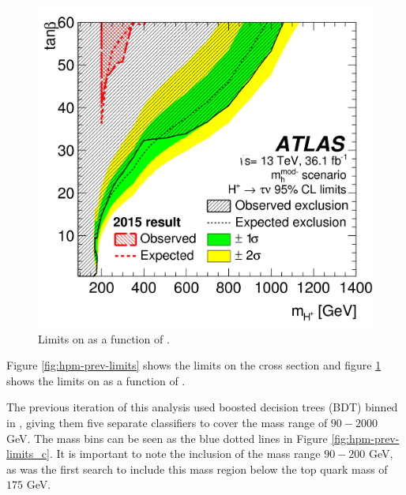 		\begin{figure}[!ht]
			\centering
			\includegraphics[width=0.75\linewidth]{chapters/chapter1_theory/images/Previous_Limits_Combined_tanb.png}
			\caption{\label{fig:hpm-prev-limits-tanb} Limits on \tanb as a function of \mHpm. \cite{hpm-previous} }
		\end{figure}
		Figure \ref{fig:hpm-prev-limits} shows the limits on the cross section and figure \ref{fig:hpm-prev-limits-tanb} shows the limits on \tanb as a function of \mHpm. 

		The previous iteration of this analysis used boosted decision trees (BDT) binned in \mHpm, giving them five separate classifiers to cover the mass range of $90 - 2000$ GeV. The mass bins can be seen as the blue dotted lines in Figure \ref{fig:hpm-prev-limits_c}. It is important to note the inclusion of the mass range $90 - 200$ GeV, as \cite{hpm-previous} was the first search to include this mass region below the top quark mass of $175$ GeV.